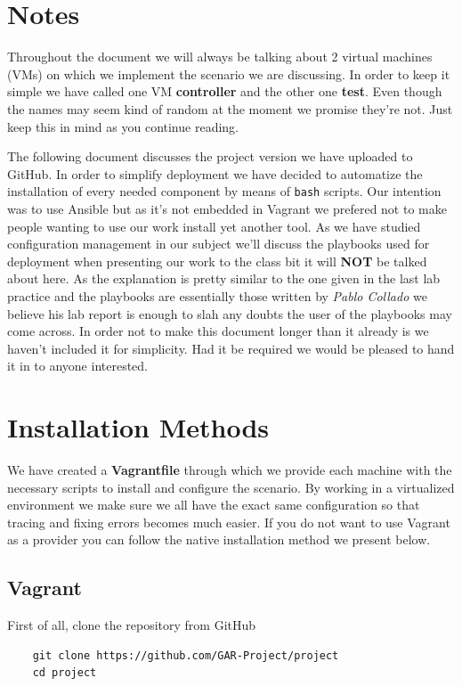 \documentclass[12pt]{article}
\newcommand{\newpar} {
    \vskip 1cm
}
\begin{document}
\nocite{*}
\newpage
\tableofcontents
\newpage
\newpage

\section{Notes}
	Throughout the document we will always be talking about 2 virtual machines (VMs) on which we implement the scenario we are discussing. In order to keep it simple we have called one VM \textbf{controller} and the other one \textbf{test}. Even though the names may seem kind of random at the moment we promise they're not. Just keep this in mind as you continue reading.
	\newpar
	The following document discusses the project version we have uploaded to GitHub. In order to simplify deployment we have decided to automatize the installation of every needed component by means of \texttt{bash} scripts. Our intention was to use Ansible but as it's not embedded in Vagrant we prefered not to make people wanting to use our work install yet another tool. As we have studied configuration management in our subject we'll discuss the playbooks used for deployment when presenting our work to the class bit it will \textbf{NOT} be talked about here. As the explanation is pretty similar to the one given in the last lab practice and the playbooks are essentially those written by \textit{Pablo Collado} we believe his lab report is enough to slah any doubts the user of the playbooks may come across. In order not to make this document longer than it already is we haven't included it for simplicity. Had it be required we would be pleased to hand it in to anyone interested.

\section{Installation Methods}
	We have created a \textbf{Vagrantfile} through which we provide each machine with the necessary scripts to install and configure the scenario. By working in a virtualized environment we make sure we all have the exact same configuration so that tracing and fixing errors becomes much easier. If you do not want to use Vagrant as a provider you can follow the native installation method we present below.

	\subsection{Vagrant}
		First of all, clone the repository from GitHub 
			\begin{verbatim}
	git clone https://github.com/GAR-Project/project
	cd project
			\end{verbatim}
\end{document}
